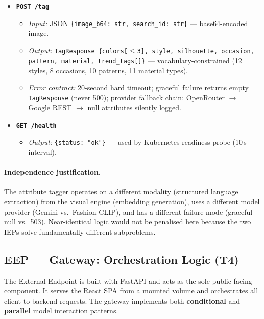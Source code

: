 \documentclass[12pt]{article}
\begin{document}
\begin{itemize}[leftmargin=*]
    \item \textbf{\texttt{POST /tag}}
      \begin{itemize}
          \item \emph{Input:} JSON \texttt{\{image\_b64: str, search\_id: str\}} --- base64-encoded image.
          \item \emph{Output:} \texttt{TagResponse \{colors[$\le$3], style, silhouette, occasion, pattern, material, trend\_tags[]\}} --- vocabulary-constrained (12 styles, 8 occasions, 10 patterns, 11 material types).
          \item \emph{Error contract:} 20-second hard timeout; graceful failure returns empty \texttt{TagResponse} (never 500); provider fallback chain: OpenRouter $\to$ Google REST $\to$ null attributes silently logged.
      \end{itemize}

    \item \textbf{\texttt{GET /health}}
      \begin{itemize}
          \item \emph{Output:} \texttt{\{status: "ok"\}} --- used by Kubernetes readiness probe (10\,s interval).
      \end{itemize}
\end{itemize}

\paragraph{Independence justification.} The attribute tagger operates on a different modality (structured language extraction) from the visual engine (embedding generation), uses a different model provider (Gemini vs.\ Fashion-CLIP), and has a different failure mode (graceful null vs.\ 503). Near-identical logic would not be penalised here because the two IEPs solve fundamentally different subproblems.

\subsection{EEP --- Gateway: Orchestration Logic (T4)}

The External Endpoint is built with FastAPI and acts as the sole public-facing component. It serves the React SPA from a mounted volume and orchestrates all client-to-backend requests. The gateway implements both \textbf{conditional} and \textbf{parallel} model interaction patterns.
\end{document}
